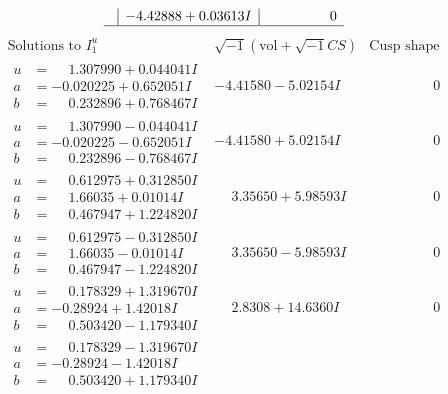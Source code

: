 \documentclass[1p]{elsarticle_modified}
\theoremstyle{definition}
\newcommand{\I}{\sqrt{-1}}
\begin{document}
$$\begin{array}{c|c|c}
 & -4.42888 + 0.03613 I & \phantom{-0.000000 } 0\\
 \hline 
 \end{array}$$\newpage$$\begin{array}{c|c|c}  
\text{Solutions to }I^u_{1}& \I (\text{vol} + \sqrt{-1}CS) & \text{Cusp shape}\\
 \hline 
\begin{aligned}
u &= \phantom{-}1.307990 + 0.044041 I \\
a &= -0.020225 + 0.652051 I \\
b &= \phantom{-}0.232896 + 0.768467 I\end{aligned}
 & -4.41580 - 5.02154 I & \phantom{-0.000000 } 0 \\ \hline\begin{aligned}
u &= \phantom{-}1.307990 - 0.044041 I \\
a &= -0.020225 - 0.652051 I \\
b &= \phantom{-}0.232896 - 0.768467 I\end{aligned}
 & -4.41580 + 5.02154 I & \phantom{-0.000000 } 0 \\ \hline\begin{aligned}
u &= \phantom{-}0.612975 + 0.312850 I \\
a &= \phantom{-}1.66035 + 0.01014 I \\
b &= \phantom{-}0.467947 + 1.224820 I\end{aligned}
 & \phantom{-}3.35650 + 5.98593 I & \phantom{-0.000000 } 0 \\ \hline\begin{aligned}
u &= \phantom{-}0.612975 - 0.312850 I \\
a &= \phantom{-}1.66035 - 0.01014 I \\
b &= \phantom{-}0.467947 - 1.224820 I\end{aligned}
 & \phantom{-}3.35650 - 5.98593 I & \phantom{-0.000000 } 0 \\ \hline\begin{aligned}
u &= \phantom{-}0.178329 + 1.319670 I \\
a &= -0.28924 + 1.42018 I \\
b &= \phantom{-}0.503420 - 1.179340 I\end{aligned}
 & \phantom{-}2.8308 + 14.6360 I & \phantom{-0.000000 } 0 \\ \hline\begin{aligned}
u &= \phantom{-}0.178329 - 1.319670 I \\
a &= -0.28924 - 1.42018 I \\
b &= \phantom{-}0.503420 + 1.179340 I\end{aligned}

\end{array}$$
\end{document}
